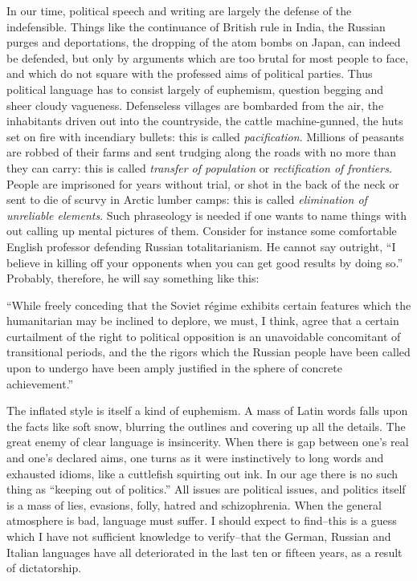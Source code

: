 \documentclass[a4paper]{article}
\begin{document}
In our time, political speech and writing are largely the defense of the indefensible. Things like the continuance of British rule in India, the Russian purges and deportations, the dropping of the atom bombs on Japan, can indeed be defended, but only by arguments which are too brutal for most people to face, and which do not square with the professed aims of political parties. Thus political language has to consist largely of euphemism, question begging and sheer cloudy vagueness. Defenseless villages are bombarded from the air, the inhabitants driven out into the countryside, the cattle machine-gunned, the huts set on fire with incendiary bullets: this is called \textit{pacification}. Millions of peasants are robbed of their farms and sent trudging along the roads with no more than they can carry: this is called \textit{transfer of population} or \textit{rectification of frontiers}. People are imprisoned for years without trial, or shot in the back of the neck or sent to die of scurvy in Arctic lumber camps: this is called \textit{elimination of unreliable elements}. Such phraseology is needed if one wants to name things with out calling up mental pictures of them. Consider for instance some comfortable English professor defending Russian totalitarianism. He cannot say outright, ``I believe in killing off your opponents when you can get good results by doing so.'' Probably, therefore, he will say something like this:

``While freely conceding that the Soviet régime exhibits certain features which the humanitarian may be inclined to deplore, we must, I think, agree that a certain curtailment of the right to political opposition is an unavoidable concomitant of transitional periods, and the the rigors which the Russian people have been called upon to undergo have been amply justified in the sphere of concrete achievement.''

The inflated style is itself a kind of euphemism. A mass of Latin words falls upon the facts like soft snow, blurring the outlines and covering up all the details. The great enemy of clear language is insincerity. When there is gap between one's real and one's declared aims, one turns as it were instinctively to long words and exhausted idioms, like a cuttlefish squirting out ink. In our age there is no such thing as ``keeping out of politics.'' All issues are political issues, and politics itself is a mass of lies, evasions, folly, hatred and schizophrenia. When the general atmosphere is bad, language must suffer. I should expect to find--this is a guess which I have not sufficient knowledge to verify--that the German, Russian and Italian languages have all deteriorated in the last ten or fifteen years, as a result of dictatorship. 
\end{document}
